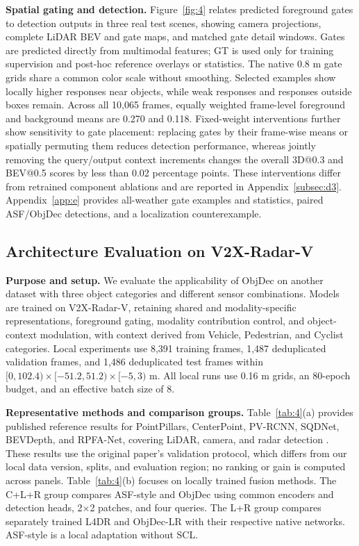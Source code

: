 \textbf{Spatial gating and detection.} Figure~\ref{fig:4} relates predicted foreground gates to detection outputs in three real test scenes, showing camera projections, complete LiDAR BEV and gate maps, and matched gate detail windows. Gates are predicted directly from multimodal features; GT is used only for training supervision and post-hoc reference overlays or statistics. The native 0.8 m gate grids share a common color scale without smoothing. Selected examples show locally higher responses near objects, while weak responses and responses outside boxes remain. Across all 10,065 frames, equally weighted frame-level foreground and background means are 0.270 and 0.118. Fixed-weight interventions further show sensitivity to gate placement: replacing gates by their frame-wise means or spatially permuting them reduces detection performance, whereas jointly removing the query/output context increments changes the overall 3D@0.3 and BEV@0.5 scores by less than 0.02 percentage points. These interventions differ from retrained component ablations and are reported in Appendix~\ref{subsec:d3}. Appendix~\ref{app:e} provides all-weather gate examples and statistics, paired ASF/ObjDec detections, and a localization counterexample.

\subsection{Architecture Evaluation on V2X-Radar-V}
\label{subsec:45}

\textbf{Purpose and setup.} We evaluate the applicability of ObjDec on another dataset with three object categories and different sensor combinations. Models are trained on V2X-Radar-V, retaining shared and modality-specific representations, foreground gating, modality contribution control, and object-context modulation, with context derived from Vehicle, Pedestrian, and Cyclist categories. Local experiments use 8,391 training frames, 1,487 deduplicated validation frames, and 1,486 deduplicated test frames within \([0,102.4)\times[-51.2,51.2)\times[-5,3)\) m. All local runs use 0.16 m grids, an 80-epoch budget, and an effective batch size of 8.

\textbf{Representative methods and comparison groups.} Table~\ref{tab:4}(a) provides published reference results for PointPillars, CenterPoint, PV-RCNN, SQDNet, BEVDepth, and RPFA-Net, covering LiDAR, camera, and radar detection \citep{yang2025v2xradar}. These results use the original paper's validation protocol, which differs from our local data version, splits, and evaluation region; no ranking or gain is computed across panels. Table~\ref{tab:4}(b) focuses on locally trained fusion methods. The C+L+R group compares ASF-style and ObjDec using common encoders and detection heads, 2\(\times\)2 patches, and four queries. The L+R group compares separately trained L4DR and ObjDec-LR with their respective native networks. ASF-style is a local adaptation without SCL.

